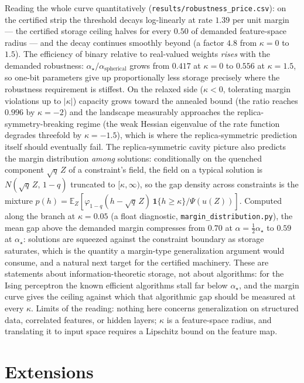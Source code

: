 \documentclass[11pt]{article}
\theoremstyle{remark}
\newcommand{\E}{\mathbb{E}}
\begin{document}
Reading the whole curve quantitatively
(\texttt{results/robustness\_price.csv}): on the certified strip the
threshold decays log-linearly at rate $1.39$ per unit margin ---
the certified storage ceiling halves for every $0.50$ of demanded
feature-space radius --- and the decay continues smoothly beyond (a
factor $4.8$ from $\kappa=0$ to $1.5$).  The efficiency of binary
relative to real-valued weights \emph{rises} with the demanded
robustness: $\alpha_\star/\alpha_{\mathrm{spherical}}$ grows from
$0.417$ at $\kappa=0$ to $0.556$ at $\kappa=1.5$, so one-bit
parameters give up proportionally less storage precisely where the
robustness requirement is stiffest.  On the relaxed side ($\kappa<0$,
tolerating margin violations up to $|\kappa|$) capacity grows toward
the annealed bound (the ratio reaches $0.996$ by $\kappa=-2$) and the
landscape measurably approaches the replica-symmetry-breaking regime
(the weak Hessian eigenvalue of the rate function degrades threefold
by $\kappa=-1.5$), which is where the replica-symmetric prediction
itself should eventually fail.
The replica-symmetric cavity picture also predicts the margin
distribution \emph{among} solutions: conditionally on the quenched
component $\sqrt{q}\,Z$ of a constraint's field, the field on a
typical solution is $N(\sqrt q\,Z,\,1-q)$ truncated to $[\kappa,
\infty)$, so the gap density across constraints is the mixture
$p(h)=\E_Z[\varphi_{1-q}(h-\sqrt q\,Z)\,\mathbf 1\{h\ge\kappa\}/
\Psi(u(Z))]$.  Computed along the branch at $\kappa=0.05$ (a float
diagnostic, \texttt{margin\_distribution.py}), the mean gap above the
demanded margin compresses from $0.70$ at $\alpha=\tfrac12
\alpha_\star$ to $0.59$ at $\alpha_\star$: solutions are squeezed
against the constraint boundary as storage saturates, which is the
quantity a margin-type generalization argument would consume, and a
natural next target for the certified machinery.  These are
statements about information-theoretic storage, not about
algorithms: for the Ising perceptron the known efficient algorithms
stall far below $\alpha_\star$, and the margin curve gives the
ceiling against which that algorithmic gap should be measured at
every $\kappa$.  Limits of the reading: nothing here concerns
generalization on structured data, correlated features, or hidden
layers; $\kappa$ is a feature-space radius, and translating it to
input space requires a Lipschitz bound on the feature map.



\section{Extensions}\label{sec:extensions}
\end{document}
